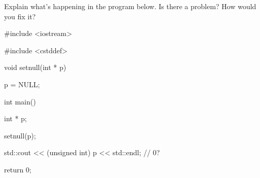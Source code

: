 Explain what's happening in the program below. Is there a problem? How would you fix it?



\begin{consolethree}[escapeinside=||]

#include <iostream>

#include <cstddef>



void setnull(int * p)

{

    p = NULL;

}



int main()

{

    int * p;

    setnull(p);



    std::cout << (unsigned int) p << std::endl; // 0?



    return 0;

}

\end{consolethree}

